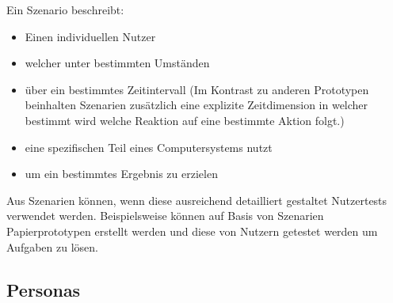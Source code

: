  Ein Szenario beschreibt:

\begin{itemize}
	\item Einen individuellen Nutzer
	\item welcher unter bestimmten Umständen
	\item über ein bestimmtes Zeitintervall (Im Kontrast zu anderen Prototypen beinhalten Szenarien zusätzlich eine explizite Zeitdimension in welcher bestimmt wird welche Reaktion auf eine bestimmte Aktion folgt.)
	\item eine spezifischen Teil eines Computersystems nutzt
	\item um ein bestimmtes Ergebnis zu erzielen
\end{itemize}

 \cite[S.~101]{Nielsen1994} Aus Szenarien können, wenn diese ausreichend detailliert gestaltet Nutzertests verwendet werden. Beispielsweise können auf Basis von Szenarien Papierprototypen erstellt werden 
 und diese von Nutzern getestet werden um Aufgaben zu lösen. 

\subsection{Personas}





